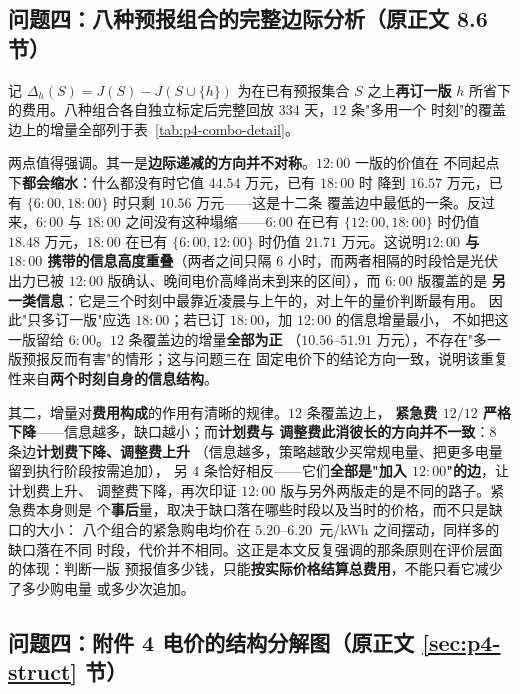 \subsection{问题四：八种预报组合的完整边际分析（原正文 8.6 节）}
\label{app:p4-combo-detail}

记 $\Delta_h(S)=J(S)-J(S\cup\{h\})$ 为在已有预报集合 $S$ 之上\textbf{再订一版}
$h$ 所省下的费用。八种组合各自独立标定后完整回放 334 天，$12$ 条"多用一个
时刻"的覆盖边上的增量全部列于表~\ref{tab:p4-combo-detail}。



两点值得强调。其一是\textbf{边际递减的方向并不对称}。$12{:}00$ 一版的价值在
不同起点下\textbf{都会缩水}：什么都没有时它值 $44.54$ 万元，已有 $18{:}00$ 时
降到 $16.57$ 万元，已有 $\{6{:}00,18{:}00\}$ 时只剩 $10.56$ 万元——这是十二条
覆盖边中最低的一条。反过来，$6{:}00$ 与 $18{:}00$ 之间没有这种塌缩——$6{:}00$
在已有 $\{12{:}00,18{:}00\}$ 时仍值 $18.48$ 万元，$18{:}00$ 在已有
$\{6{:}00,12{:}00\}$ 时仍值 $21.71$ 万元。这说明\textbf{$12{:}00$ 与
$18{:}00$ 携带的信息高度重叠}（两者之间只隔 6 小时，而两者相隔的时段恰是光伏
出力已被 $12{:}00$ 版确认、晚间电价高峰尚未到来的区间），而 $6{:}00$ 版覆盖的是
\textbf{另一类信息}：它是三个时刻中最靠近凌晨与上午的，对上午的量价判断最有用。
因此"只多订一版"应选 $18{:}00$；若已订 $18{:}00$，加 $12{:}00$ 的信息增量最小，
不如把这一版留给 $6{:}00$。$12$ 条覆盖边的增量\textbf{全部为正}
（$10.56$--$51.91$ 万元），不存在"多一版预报反而有害"的情形；这与问题三在
固定电价下的结论方向一致，说明该重复性来自\textbf{两个时刻自身的信息结构}。

其二，增量对\textbf{费用构成}的作用有清晰的规律。$12$ 条覆盖边上，
\textbf{紧急费 $12/12$ 严格下降}——信息越多，缺口越小；而\textbf{计划费与
调整费此消彼长的方向并不一致}：$8$ 条边\textbf{计划费下降、调整费上升}
（信息越多，策略越敢少买常规电量、把更多电量留到执行阶段按需追加），
另 $4$ 条恰好相反——它们\textbf{全部是"加入 $12{:}00$"的边}，让计划费上升、
调整费下降，再次印证 $12{:}00$ 版与另外两版走的是不同的路子。紧急费本身则是
个\textbf{事后}量，取决于缺口落在哪些时段以及当时的价格，而不只是缺口的大小：
八个组合的紧急购电均价在 $5.20$--$6.20$~元/kWh 之间摆动，同样多的缺口落在不同
时段，代价并不相同。这正是本文反复强调的那条原则在评价层面的体现：判断一版
预报值多少钱，只能\textbf{按实际价格结算总费用}，不能只看它减少了多少购电量
或多少次追加。


\subsection{问题四：附件 4 电价的结构分解图（原正文 \ref{sec:p4-struct} 节）}

